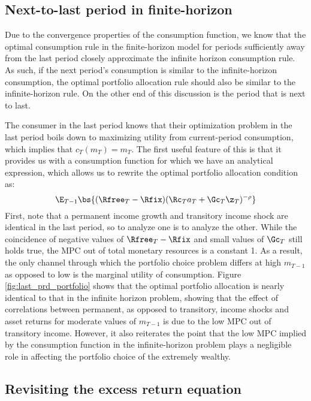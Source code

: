 \subsection{Next-to-last period in finite-horizon}\label{finite_horizon}

Due to the convergence properties of the consumption function, we know that the optimal consumption rule in the finite-horizon model for periods sufficiently away from the last period closely approximate the infinite horizon consumption rule. As such, if the next period's consumption is similar to the infinite-horizon consumption, the optimal portfolio allocation rule should also be similar to the infinite-horizon rule. On the other end of this discussion is the period that is next to last.

The consumer in the last period knows that their optimization problem in the last period boils down to maximizing utility from current-period consumption, which implies that $c_T(m_T) = m_T$. The first useful feature of this is that it provides us with a consumption function for which we have an analytical expression, which allows us to rewrite the optimal portfolio allocation condition as:
\[
\E_{T-1}\bs{(\Rfree_{T} - \Rfix)(\Rc_{T}a_{T} + \Gc_{T}\z_{T})^{-\rho}}
\]
First, note that a permanent income growth and transitory income shock are identical in the last period, so to analyze one is to analyze the other. While the coincidence of negative values of $\Rfree_{T} - \Rfix$ and small values of $\Gc_{T}$ still holds true, the MPC out of total monetary resources is a constant 1. As a result, the only channel through which the portfolio choice problem differs at high $m_{T-1}$ as opposed to low is the marginal utility of consumption. Figure \ref{fig:last_prd_portfolio} shows that the optimal portfolio allocation is nearly identical to that in the infinite horizon problem, showing that the effect of correlations between permanent, as opposed to transitory, income shocks and asset returns for moderate values of $m_{T-1}$ is due to the low MPC out of transitory income. However, it also reiterates the point that the low MPC implied by the consumption function in the infinite-horizon problem plays a negligible role in affecting the portfolio choice of the extremely wealthy.

\subsection{Revisiting the excess return equation}

